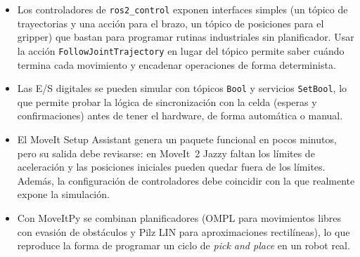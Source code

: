 \documentclass[11pt,letterpaper]{article}
\begin{document}
\begin{itemize}[leftmargin=*]
  \item Los controladores de \texttt{ros2\_control} exponen interfaces simples (un tópico de trayectorias y una acción para el brazo, un tópico de posiciones para el gripper) que bastan para programar rutinas industriales sin planificador. Usar la acción \texttt{FollowJointTrajectory} en lugar del tópico permite saber cuándo termina cada movimiento y encadenar operaciones de forma determinista.
  \item Las E/S digitales se pueden simular con tópicos \texttt{Bool} y servicios \texttt{SetBool}, lo que permite probar la lógica de sincronización con la celda (esperas y confirmaciones) antes de tener el hardware, de forma automática o manual.
  \item El MoveIt Setup Assistant genera un paquete funcional en pocos minutos, pero su salida debe revisarse: en MoveIt~2 Jazzy faltan los límites de aceleración y las posiciones iniciales pueden quedar fuera de los límites. Además, la configuración de controladores debe coincidir con la que realmente expone la simulación.
  \item Con MoveItPy se combinan planificadores (OMPL para movimientos libres con evasión de obstáculos y Pilz LIN para aproximaciones rectilíneas), lo que reproduce la forma de programar un ciclo de \emph{pick and place} en un robot real.
\end{itemize}
\end{document}
